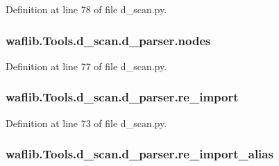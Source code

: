 Definition at line 78 of file d\+\_\+scan.\+py.

\subsubsection[{\texorpdfstring{nodes}{nodes}}]{\setlength{\rightskip}{0pt plus 5cm}waflib.\+Tools.\+d\+\_\+scan.\+d\+\_\+parser.\+nodes}\hypertarget{classwaflib_1_1_tools_1_1d__scan_1_1d__parser_a36c276a789c3937678296d63ad4e9b76}{}\label{classwaflib_1_1_tools_1_1d__scan_1_1d__parser_a36c276a789c3937678296d63ad4e9b76}


Definition at line 77 of file d\+\_\+scan.\+py.

\subsubsection[{\texorpdfstring{re\+\_\+import}{re_import}}]{\setlength{\rightskip}{0pt plus 5cm}waflib.\+Tools.\+d\+\_\+scan.\+d\+\_\+parser.\+re\+\_\+import}\hypertarget{classwaflib_1_1_tools_1_1d__scan_1_1d__parser_ada8845d10e9524f02296c2db65f9ce39}{}\label{classwaflib_1_1_tools_1_1d__scan_1_1d__parser_ada8845d10e9524f02296c2db65f9ce39}


Definition at line 73 of file d\+\_\+scan.\+py.

\subsubsection[{\texorpdfstring{re\+\_\+import\+\_\+alias}{re_import_alias}}]{\setlength{\rightskip}{0pt plus 5cm}waflib.\+Tools.\+d\+\_\+scan.\+d\+\_\+parser.\+re\+\_\+import\+\_\+alias}\hypertarget{classwaflib_1_1_tools_1_1d__scan_1_1d__parser_ae73756694932075139b67fa39957255c}{}\label{classwaflib_1_1_tools_1_1d__scan_1_1d__parser_ae73756694932075139b67fa39957255c}


